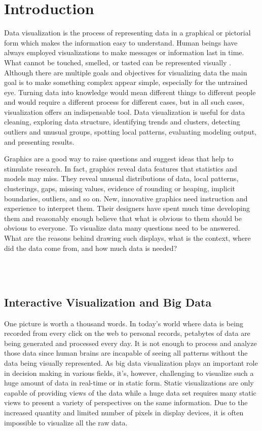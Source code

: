 \section{Introduction}

Data visualization is the process of representing data in a graphical or pictorial form which makes the information easy to understand.  Human beings have always employed visualizations to make messages or information last in time. What cannot be touched, smelled, or tasted can be represented visually \cite{sancho2014approach}.
Although there are multiple goals and objectives for visualizing data the main goal is to make something complex appear simple, especially for the untrained eye. Turning data into knowledge would mean different things to different people and would require a different process for different cases, but in all such cases, visualization offers an indispensable tool. Data visualization is useful for data cleaning, exploring data structure, identifying trends and clusters, detecting outliers and unusual groups, spotting local patterns, evaluating modeling output, and presenting results.

Graphics are a good way to raise questions and suggest ideas that help to stimulate research.
In fact, graphics reveal data features that statistics and models may miss. They reveal unusual distributions of data, local patterns, clusterings, gaps, missing values, evidence of rounding or heaping, implicit boundaries, outliers, and so on.  New, innovative graphics need instruction and experience to interpret them. Their designers have spent much time developing them and reasonably enough believe that what is obvious to them should be obvious to everyone.  To visualize data many questions need to be answered. What are the reasons behind drawing such displays, what is the context, where did the data come from, and how much data is needed? 


 
 \\\

\subsection{Interactive Visualization and Big Data}

One picture is worth a thousand words. In today's world where data is being recorded from every click on the web to personal records, petabytes of data are being generated and processed every day. It is not enough to process and analyze those data since human brains are incapable of seeing all patterns without the data being visually represented. As big data visualization plays an important role in decision making in various fields, it's, however, challenging to visualize such a huge amount of data in real-time or in static form. Static visualizations are only capable of providing views of the data while a huge data set requires many static views to present a variety of perspectives on the same information. Due to the increased quantity and limited number of pixels in display devices, it is often impossible to visualize all the raw data.





